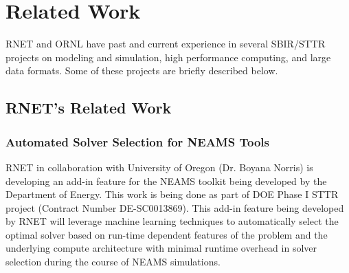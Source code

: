 
\section{Related Work}
\label{related}

RNET and ORNL have past and current experience in several SBIR/STTR projects on modeling and simulation, high performance computing, 
and large data formats. Some of these projects are briefly described below. 

\subsection{RNET's Related Work}

\subsubsection{Automated Solver Selection for NEAMS Tools}

RNET in collaboration with University of Oregon (Dr. Boyana Norris) is developing an add-in feature for the NEAMS 
toolkit being developed by the Department of Energy. This work is being done as part of DOE Phase I STTR project 
(Contract Number DE-SC0013869). This add-in feature being developed by RNET will leverage machine learning techniques 
to automatically select the optimal solver based on run-time dependent features of the problem and the underlying 
compute architecture with minimal runtime overhead in solver selection during the course of NEAMS simulations.




